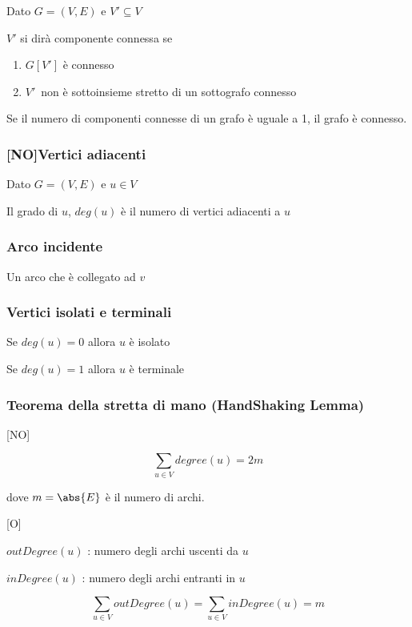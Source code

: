 \documentclass[tikz]{article}
\providecommand{\tightlist}{%
  \setlength{\itemsep}{0pt}\setlength{\parskip}{0pt}}
\begin{document}
{Dato $G=(V,E)$ e $V' \subseteq V$}

{$V'$ si dirà componente connessa se }

\begin{enumerate}
\tightlist
\item
  {$G[V']$ è connesso}
\item
  $V'${~non è sottoinsieme stretto di un sottografo connesso}
\end{enumerate}

{Se il numero di componenti connesse di un grafo è uguale a 1, }{il
grafo è connesso.}

\subsubsection{{[}NO{]}Vertici adiacenti}

{Dato $G=(V,E)$ e $u \in V$}

{Il grado di $u$, $deg(u)$ è il numero di vertici adiacenti a $u$}

\subsubsection{Arco incidente}

{Un arco che è collegato ad $v$}

\subsubsection{Vertici isolati e terminali}

{Se $deg(u) = 0$ allora $u$ è isolato}

{Se $deg(u) = 1$ allora $u$ è terminale}

\subsubsection{Teorema della stretta di mano (HandShaking Lemma)}

{{[}NO{]}}

\begin{equation}
\sum_{u \in V}{degree(u)} = 2m
\end{equation}

{dove $m = \abs{E}$ è il numero di archi.}

{{[}O{]}}

{$outDegree(u)$ : numero degli archi uscenti da $u$}

{$inDegree(u)$ : numero degli archi entranti in $u$}

\begin{equation}
\sum_{u \in V}{outDegree(u)} = \sum_{u \in V}{inDegree(u)} = m
\end{equation}
\end{document}
